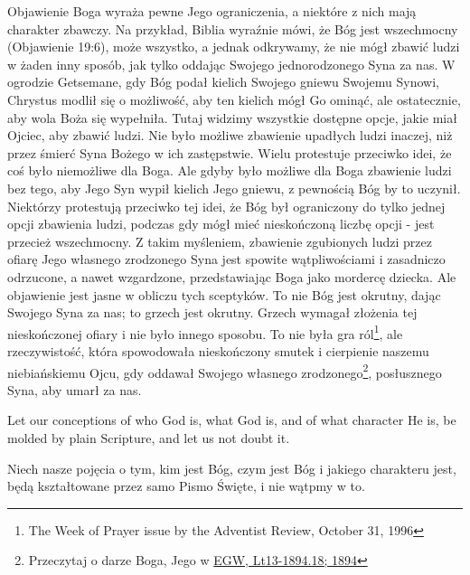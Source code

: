 Objawienie Boga wyraża pewne Jego ograniczenia, a niektóre z nich mają charakter zbawczy. Na przykład, Biblia wyraźnie mówi, że Bóg jest wszechmocny (Objawienie 19:6), może wszystko, a jednak odkrywamy, że nie mógł zbawić ludzi w żaden inny sposób, jak tylko oddając Swojego jednorodzonego Syna za nas. W ogrodzie Getsemane, gdy Bóg podał kielich Swojego gniewu Swojemu Synowi, Chrystus modlił się o możliwość, aby ten kielich mógł Go ominąć, ale ostatecznie, aby wola Boża się wypełniła. Tutaj widzimy wszystkie dostępne opcje, jakie miał Ojciec, aby zbawić ludzi. Nie było możliwe zbawienie upadłych ludzi inaczej, niż przez śmierć Syna Bożego w ich zastępstwie. Wielu protestuje przeciwko idei, że coś było niemożliwe dla Boga. Ale gdyby było możliwe dla Boga zbawienie ludzi bez tego, aby Jego Syn wypił kielich Jego gniewu, z pewnością Bóg by to uczynił. Niektórzy protestują przeciwko tej idei, że Bóg był ograniczony do tylko jednej opcji zbawienia ludzi, podczas gdy mógł mieć nieskończoną liczbę opcji - jest przecież wszechmocny. Z takim myśleniem, zbawienie zgubionych ludzi przez ofiarę Jego własnego zrodzonego Syna jest spowite wątpliwościami i zasadniczo odrzucone, a nawet wzgardzone, przedstawiając Boga jako mordercę dziecka. Ale objawienie jest jasne w obliczu tych sceptyków. To nie Bóg jest okrutny, dając Swojego Syna za nas; to grzech jest okrutny. Grzech wymagał złożenia tej nieskończonej ofiary i nie było innego sposobu. To nie była gra ról\footnote{The Week of Prayer issue by the Adventist Review, October 31, 1996}, ale rzeczywistość, która spowodowała nieskończony smutek i cierpienie naszemu niebiańskiemu Ojcu, gdy oddawał Swojego własnego zrodzonego\footnote{Przeczytaj o darze Boga, Jego  w \href{https://egwwritings.org/?ref=en_Lt13-1894.18&para=5486.24}{{EGW, Lt13-1894.18; 1894}}}, posłusznego Syna, aby umarł za nas.


Let our conceptions of who God is, what God is, and of what character He is, be molded by plain Scripture, and let us not doubt it.


Niech nasze pojęcia o tym, kim jest Bóg, czym jest Bóg i jakiego charakteru jest, będą kształtowane przez samo Pismo Święte, i nie wątpmy w to.


%

% 